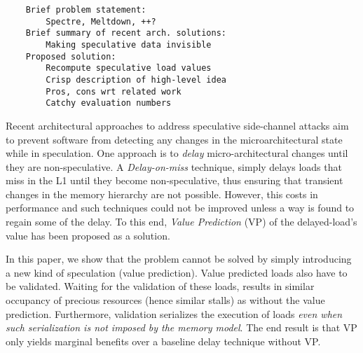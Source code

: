 \begin{verbatim}
    Brief problem statement: 
        Spectre, Meltdown, ++?
    Brief summary of recent arch. solutions: 
        Making speculative data invisible
    Proposed solution: 
        Recompute speculative load values
        Crisp description of high-level idea
        Pros, cons wrt related work
        Catchy evaluation numbers
\end{verbatim}

Recent architectural approaches to address speculative side-channel attacks aim to prevent software from detecting any changes %
in the microarchitectural state while in speculation. 
%
One approach is to \emph{delay} micro-architectural changes until they are non-speculative. A \emph{Delay-on-miss} technique, simply delays loads that miss in the L1 until they become non-speculative, thus ensuring that transient changes in the memory hierarchy are not possible.
%
However, this costs in performance and such techniques could not be improved unless a way is found to regain some of the delay. To this end, \emph{Value Prediction} (VP) of the delayed-load's value has been proposed as a solution.

In this paper, we show that the problem cannot be solved by simply introducing
a new kind of speculation (value prediction). 
Value predicted loads also have to be validated.
Waiting for the validation of these loads, results in similar occupancy of precious resources (hence similar stalls) as without the value prediction. Furthermore, validation serializes the execution of loads  \emph{even when such serialization is not imposed by the memory model}. The end result is that VP only yields marginal benefits over a baseline delay technique without VP.


